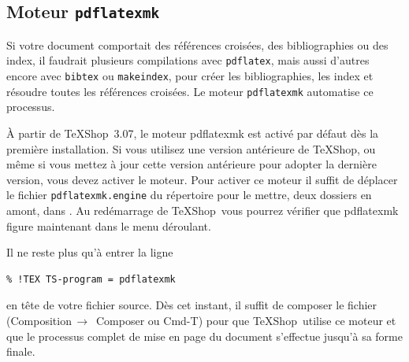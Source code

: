 \documentclass[11pt,french]{article}
\newcommand{\TS}{\textsf{\TeX Shop}}
\newcommand{\cmd}[1]{\textsf{#1}}
\newcommand{\mnu}[1]{\textsf{#1}}
\newcommand{\To}{\,\(\to\)\,}
\begin{document}
\subsection{Moteur \texttt{pdflatexmk}}

Si votre document comportait des références croisées, des bibliographies ou des index, il faudrait plusieurs compilations avec \texttt{pdflatex}, mais aussi d'autres encore avec \texttt{bibtex} ou \texttt{makeindex}, pour créer les bibliographies, les index et résoudre toutes les références croisées. Le moteur \texttt{pdflatexmk} automatise ce processus.


À partir de \TS\ 3.07, le moteur pdflatexmk est activé par défaut dès la première installation. Si vous utilisez une version antérieure de \TS, ou même si vous mettez à jour cette version antérieure pour adopter la dernière version, vous devez activer le moteur. Pour activer ce moteur il suffit de déplacer le fichier \texttt{pdflatexmk.engine} du répertoire  pour le mettre, deux dossiers en amont, dans . Au redémarrage de \TS\ vous pourrez vérifier que \cmd{pdflatexmk} figure maintenant dans le menu déroulant.

%


Il ne reste plus qu'à entrer la ligne
\begin{verbatim}
% !TEX TS-program = pdflatexmk
\end{verbatim}
en tête de votre fichier source. Dès cet instant, il suffit de composer le fichier (\mnu{Composition}\To{} \mnu{Composer} ou \cmd{Cmd-T}) pour que \TS\ utilise ce moteur et que le processus complet de mise en page du document s'effectue jusqu'à sa forme finale. 
\end{document}

